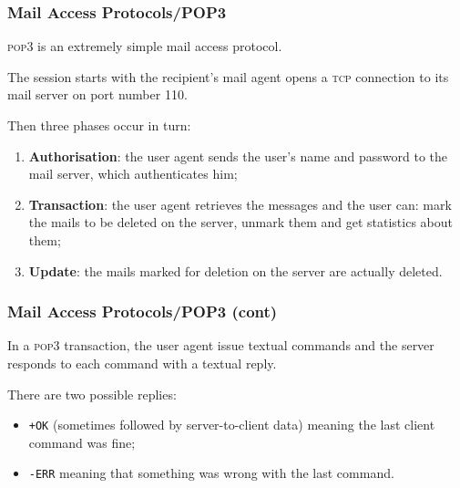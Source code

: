 %
\begin{frame}
\frametitle{Mail Access Protocols/POP3}

\textsc{pop3} is an extremely simple mail access protocol.

The session starts with the recipient's mail agent opens a
\textsc{tcp} connection to its mail server on port number 110.

Then three phases occur in turn:
\begin{enumerate}

  \item \textbf{Authorisation}: the user agent sends the user's name
  and password to the mail server, which authenticates him;

  \item \textbf{Transaction}: the user agent retrieves the messages
  and the user can: mark the mails to be deleted on the server,
  unmark them and get statistics about them;

  \item \textbf{Update}: the mails marked for deletion on the server
  are actually deleted.

\end{enumerate}

\end{frame}

%
\begin{frame}
\frametitle{Mail Access Protocols/POP3
  (cont)}

In a \textsc{pop3} transaction, the user agent issue textual commands
and the server responds to each command with a textual reply.

There are two possible replies:
\begin{itemize}

  \item \texttt{+OK} (sometimes followed by server-to-client data)
  meaning the last client command was fine;

  \item \texttt{-ERR} meaning that something was wrong with the last
  command.

\end{itemize}

\end{frame}

